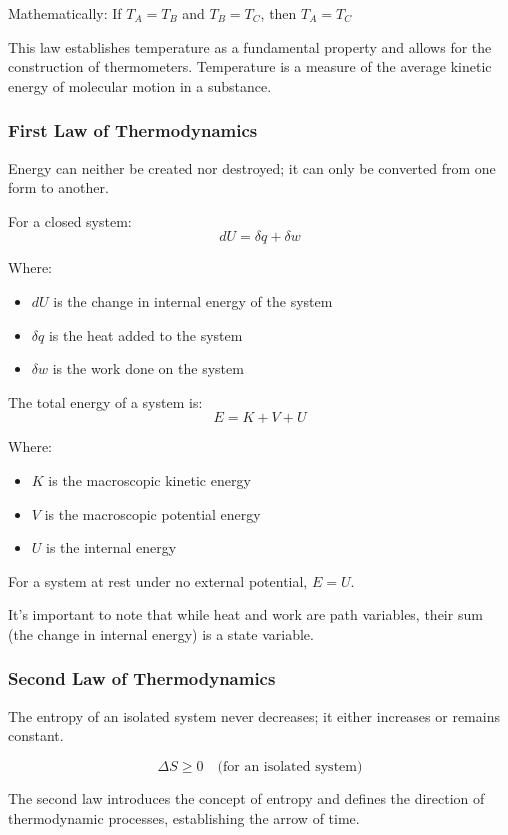 \documentclass{article}
\theoremstyle{definition}
\begin{document}
Mathematically: If $T_A = T_B$ and $T_B = T_C$, then $T_A = T_C$

This law establishes temperature as a fundamental property and allows for the construction of thermometers. Temperature is a measure of the average kinetic energy of molecular motion in a substance.

\subsubsection{First Law of Thermodynamics}

Energy can neither be created nor destroyed; it can only be converted from one form to another.

For a closed system:
\[
dU = \delta q + \delta w
\]

Where:
\begin{itemize}
    \item $dU$ is the change in internal energy of the system
    \item $\delta q$ is the heat added to the system
    \item $\delta w$ is the work done on the system
\end{itemize}

The total energy of a system is:
\[
E = K + V + U
\]

Where:
\begin{itemize}
    \item $K$ is the macroscopic kinetic energy
    \item $V$ is the macroscopic potential energy
    \item $U$ is the internal energy
\end{itemize}

For a system at rest under no external potential, $E = U$.

It's important to note that while heat and work are path variables, their sum (the change in internal energy) is a state variable.

\subsubsection{Second Law of Thermodynamics}

The entropy of an isolated system never decreases; it either increases or remains constant.

\[
\Delta S \geq 0 \quad \text{(for an isolated system)}
\]

The second law introduces the concept of entropy and defines the direction of thermodynamic processes, establishing the arrow of time.
\end{document}
